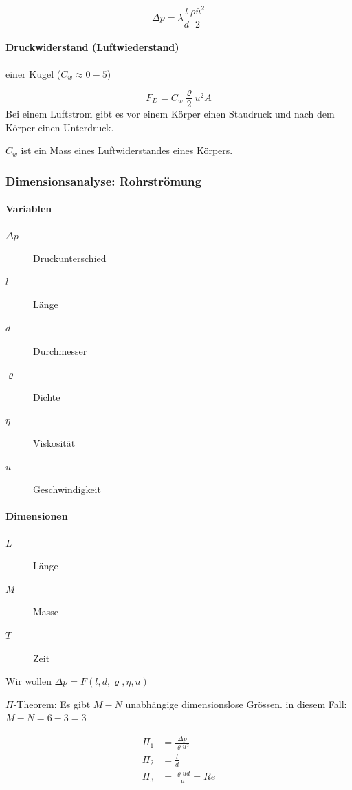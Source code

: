 \documentclass[a4paper]{scrartcl}
\begin{document}
\[
	\Delta p = \lambda \frac{l}{d}\frac{\rho \bar{u}^2}{2}
\]






\paragraph{Druckwiderstand (Luftwiederstand)} einer Kugel ($C_w \approx 0-5$)

\[
	F_D = C_w \frac{\varrho}{2} u^2 A
\]
Bei einem Luftstrom gibt es vor einem Körper einen Staudruck und nach dem Körper einen Unterdruck.


$C_w$ ist ein Mass eines Luftwiderstandes eines Körpers.


\subsubsection{Dimensionsanalyse: Rohrströmung}
\paragraph{Variablen}
\begin{description}
	
\item[$\Delta p$] Druckunterschied
\item[$l$] Länge
\item[$d$] Durchmesser
\item[$\varrho$] Dichte
\item[$\eta$] Viskosität
\item[$u$] Geschwindigkeit
\end{description}

\paragraph{Dimensionen}
\begin{description}
	\item[$L$] Länge
	\item[$M$] Masse
	\item[$T$] Zeit
\end{description}

Wir wollen $\Delta p = F(l, d, \varrho, \eta, u)$


$\Pi$-Theorem: Es gibt $M-N$ unabhängige dimensionslose Grössen. in diesem Fall: $M-N = 6-3 = 3$

\begin{align*}
\Pi_1 &= \frac{\Delta p}{\varrho u^2} \\
\Pi_2 &= \frac{l}{d} \\
\Pi_3 &= \frac{\varrho u d}{\mu} = Re
\end{align*}
\end{document}
